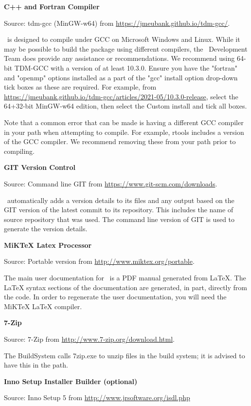 \textbf{C++ and Fortran Compiler}

Source: tdm-gcc (MinGW-w64) from \url{https://jmeubank.github.io/tdm-gcc/}.

\CNAME\ is designed to compile under GCC on Microsoft Windows and Linux. While it may be possible to build the package using different compilers, the \CNAME\ Development Team does provide any assistance or recommendations. We recommend using 64-bit TDM-GCC with a version of at least 10.3.0. Ensure you have the "fortran" and "openmp" options installed as a part of the "gcc" install option drop-down tick boxes as these are required. For example, from  \url{https://jmeubank.github.io/tdm-gcc/articles/2021-05/10.3.0-release}, select the 64+32-bit MinGW-w64 edition, then select the Custom install and tick all boxes. 

Note that a common error that can be made is having a different GCC compiler in your path when attempting to compile. For example, rtools includes a version of the GCC compiler. We recommend removing these from your path prior to compiling.

\textbf{GIT Version Control}

Source: Command line GIT from \url{https://www.git-scm.com/downloads}.

\CNAME\ automatically adds a version details to its files and any output based on the GIT version of the latest commit to its repository. This includes the name of source repository that was used. The command line version of GIT is used  to generate the version details.

\textbf{MiKTeX Latex Processor}

Source: Portable version from \url{http://www.miktex.org/portable}.

The main user documentation for \CNAME\ is a PDF manual generated from LaTeX. The LaTeX syntax sections of the documentation are generated, in part, directly from the code. In order to regenerate the user documentation, you will need the MiKTeX LaTeX compiler.

\textbf{7-Zip}

Source: 7-Zip from \url{http://www.7-zip.org/download.html}.

The BuildSystem calls 7zip.exe to unzip files in the build system; it is advised to have this in the path.

\textbf{Inno Setup Installer Builder (optional)}

Source: Inno Setup 5 from \url{http://www.jrsoftware.org/isdl.php}

